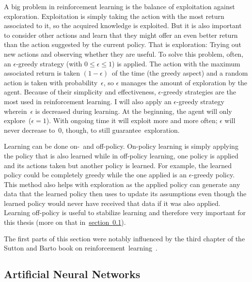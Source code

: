 \documentclass[a4paper,titlepage]{article}
\begin{document}
A big problem in reinforcement learning is the balance of exploitation against exploration. Exploitation is simply taking the action with the most return associated to it, so the acquired knowledge is exploited. But it is also important to consider other actions and learn that they might offer an even better return than the action suggested by the current policy. That is exploration: Trying out new actions and observing whether they are useful. To solve this problem, often, an $\epsilon$-greedy strategy (with $0 \leq \epsilon \leq 1$) is applied. The action with the maximum associated return is taken $(1 - \epsilon)$~of the time (the greedy aspect) and a random action is taken with probability~$\epsilon$, so $\epsilon$ manages the amount of exploration by the agent. Because of their simplicity and effectiveness, $\epsilon$-greedy strategies are the most used in reinforcement learning. I will also apply an $\epsilon$-greedy strategy wherein~$\epsilon$ is decreased during learning. At the beginning, the agent will only explore~($\epsilon = 1$). With ongoing time it will exploit more and more often; $\epsilon$ will never decrease to~0, though, to still guarantee~exploration.

Learning can be done on-~and off-policy. On-policy learning is simply applying the policy that is also learned while in off-policy learning, one policy is applied and its actions taken but another policy is learned. For example, the learned policy could be completely greedy while the one applied is an $\epsilon$-greedy policy. This method also helps with exploration as the applied policy can generate any data that the learned policy then uses to update its assumptions even though the learned policy would never have received that data if it was also applied. Learning off-policy is useful to stabilize learning and therefore very important for this thesis (more on that in~\hyperref[sec:anns]{section~\ref*{sec:anns}}). \medskip

The first parts of this section were notably influenced by the third chapter of the Sutton and Barto book on reinforcement~learning~\cite{book}.

\subsection{Artificial Neural Networks}
\label{sec:anns}
\end{document}
